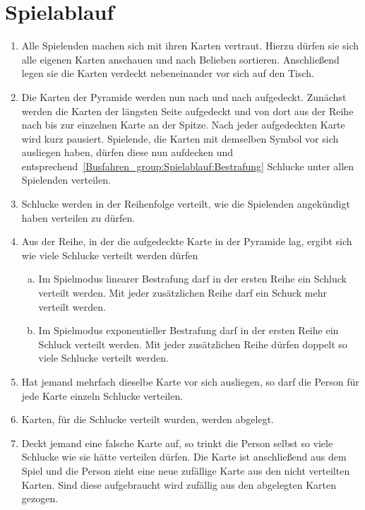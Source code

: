 \section{Spielablauf}\label{Busfahren_group:Spielablauf}
\begin{enumerate}[label={(\arabic*)}]
    \item
    Alle Spielenden machen sich mit ihren Karten vertraut.
    Hierzu dürfen sie sich alle eigenen Karten anschauen und nach Belieben sortieren.
    Anschließend legen sie die Karten verdeckt nebeneinander vor sich auf den Tisch.

    \item
    Die Karten der Pyramide werden nun nach und nach aufgedeckt.
    Zunächst werden die Karten der längsten Seite aufgedeckt und von dort aus der Reihe nach bis zur einzelnen Karte an der Spitze.
    Nach jeder aufgedeckten Karte wird kurz pausiert.
    Spielende, die Karten mit demselben Symbol vor sich ausliegen haben, dürfen diese nun aufdecken und entsprechend~\ref{Busfahren_group:Spielablauf:Bestrafung} Schlucke unter allen Spielenden verteilen.

    \item Schlucke werden in der Reihenfolge verteilt, wie die Spielenden angekündigt haben verteilen zu dürfen.

    \item\label{Busfahren_group:Spielablauf:Bestrafung}
    Aus der Reihe, in der die aufgedeckte Karte in der Pyramide lag, ergibt sich wie viele Schlucke verteilt werden dürfen
    \begin{enumerate}[a.]
        \item
        Im Spielmodus linearer Bestrafung darf in der ersten Reihe ein Schluck verteilt werden.
        Mit jeder zusätzlichen Reihe darf ein Schuck mehr verteilt werden.
        \item
        Im Spielmodus exponentieller Bestrafung darf in der ersten Reihe ein Schluck verteilt werden.
        Mit jeder zusätzlichen Reihe dürfen doppelt so viele Schlucke verteilt werden.
    \end{enumerate}

    \item 
    Hat jemand mehrfach dieselbe Karte vor sich ausliegen, so darf die Person für jede Karte einzeln Schlucke verteilen.

    \item
    Karten, für die Schlucke verteilt wurden, werden abgelegt.

    \item\label{Busfahren_group:Spielablauf:Ziehen}
    Deckt jemand eine falsche Karte auf, so trinkt die Person selbst so viele Schlucke wie sie hätte verteilen dürfen.
    Die Karte ist anschließend aus dem Spiel und die Person zieht eine neue zufällige Karte aus den nicht verteilten Karten.
    Sind diese aufgebraucht wird zufällig aus den abgelegten Karten gezogen.


\end{enumerate}
